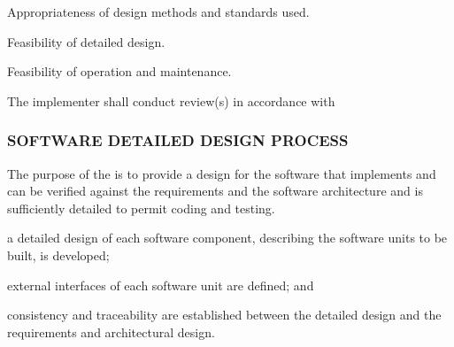 \begin{adjustwidth}{2em}{0pt}
\begin{compactenum}
\begin{compactenum}
\begin{compactenum}
							\item Appropriateness of design methods and standards used.

							\item Feasibility of detailed design.

							\item Feasibility of operation and maintenance.

						\end{compactenum}

						\item The implementer shall conduct review(s) in accordance with 

					\end{compactenum}

				\end{compactenum}

			\end{adjustwidth}

		\newpage
		\subsubsection{SOFTWARE DETAILED DESIGN PROCESS\label{proc:software_detailed_design_process}}

			\begin{adjustwidth}{2em}{0pt} 

				The purpose of the  is to provide a design for the software that implements and can be verified against the requirements and the software architecture and is sufficiently detailed to permit coding and testing.

			\end{adjustwidth}

			\begin{adjustwidth}{2em}{0pt} 

				\begin{compactitem}

					\item a detailed design of each software component, describing the software units to be built, is developed;

					\item external interfaces of each software unit are defined; and

					\item consistency and traceability are established between the detailed design and the requirements and architectural design.

				\end{compactitem}

			\end{adjustwidth}

